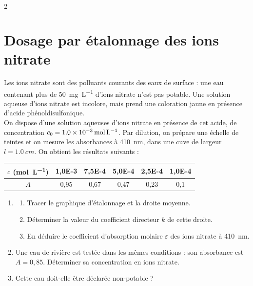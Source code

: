 \documentclass[a4paper,11pt,fleqn]{article}%
\begin{document}
\begin{multicols}{2}
    \section{Dosage par étalonnage des ions nitrate}
    Les ions nitrate  sont des polluants courants des eaux de surface : une eau contenant plus de \SI{50}{mg.L^{-1}} d'ions nitrate n'est pas potable. Une solution aqueuse d'ions nitrate est incolore, mais prend une coloration jaune en présence d'acide phénoldisulfonique.\\
    On dispose d'une solution aqueuses d'ions nitrate en présence de cet acide, de concentration $c_0 = \SI{1,0E-3}{\mole\per\liter}$. Par dilution, on prépare une échelle de teintes et on mesure les absorbances à \SI{410}{nm}, dans une cuve de largeur $l = \SI{1,0}{cm}$. On obtient les résultats suivants :
    \begin{center}
        \begin{tabular}{|c|c|c|c|c|c|}
            \hline
            $c$ (\si{\mole\per\liter}) & \num{1,0E-3} & \num{7,5E-4} & \num{5,0E-4} & \num{2,5E-4} & \num{1,0E-4} \\
            \hline
            $A$ & 0,95 & 0,67 & 0,47 & 0,23 & 0,1 \\
            \hline
        \end{tabular}
    \end{center}
    \begin{enumerate}
        \item \begin{enumerate}
            \item Tracer le graphique d'étalonnage et la droite moyenne.
            \item Déterminer la valeur du coefficient directeur $k$ de cette droite.
            \item En déduire le coefficient d'absorption molaire $\varepsilon$ des ions nitrate à \SI{410}{nm}.
        \end{enumerate} 
        \item Une eau de rivière est testée dans les mêmes conditions : son absorbance est $A = 0,85$. Déterminer sa concentration en ions nitrate.
        \item Cette eau doit-elle être déclarée non-potable ?
    \end{enumerate}


\end{multicols}
\end{document}
